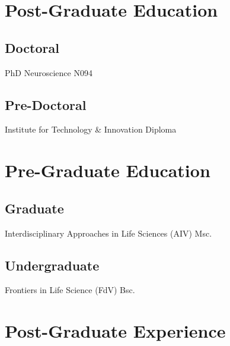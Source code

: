 \documentclass[12pt]{deedy-resume-openfont}
\begin{document}
%
%
\noindent\begin{minipage}[t]{0.44\textwidth}

\section{Post-Graduate Education}
\subsection{Doctoral}
PhD Neuroscience N094
\sectionsep

\subsection{Pre-Doctoral}
Institute for Technology \& Innovation Diploma

\end{minipage}
\hfill
\begin{minipage}[t]{0.54\textwidth}

\section{Pre-Graduate Education}
\subsection{Graduate}
Interdisciplinary Approaches in Life Sciences (AIV) Msc.
\sectionsep

\subsection{Undergraduate}
Frontiers in Life Science (FdV) Bsc.

\end{minipage}

\vspace{10pt}

%
%
\section{Post-Graduate Experience}
\end{document}
